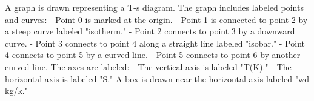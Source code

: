 A graph is drawn representing a T-s diagram. The graph includes labeled points and curves:  
- Point 0 is marked at the origin.  
- Point 1 is connected to point 2 by a steep curve labeled "isotherm."  
- Point 2 connects to point 3 by a downward curve.  
- Point 3 connects to point 4 along a straight line labeled "isobar."  
- Point 4 connects to point 5 by a curved line.  
- Point 5 connects to point 6 by another curved line.  
The axes are labeled:  
- The vertical axis is labeled "T(K)."  
- The horizontal axis is labeled "S."  
A box is drawn near the horizontal axis labeled "wd kg/k."
